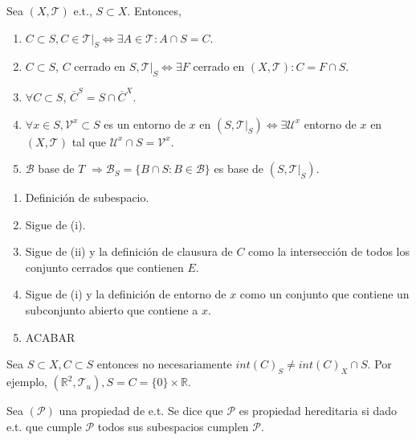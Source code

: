 \begin{prop}
  Sea $( X, \mathcal{T} )$ e.t., $S \subset X$. Entonces,
  \begin{enumerate}[label=(\roman*)]
    \item $C \subset S, C \in \mathcal{T}|_{S} \Leftrightarrow \exists A \in \mathcal{T} : A \cap S = C$.
    \item $C \subset S$, $C$ cerrado en $S, \mathcal{T}|_{S} \Leftrightarrow \exists F$ cerrado en $( X, \mathcal{T} ): C = F \cap S$.
    \item $\forall C \subset S$, $\overline{C}^{S} = S \cap \overline{C}^{X}$.
    \item $\forall x \in S, \mathcal{V}^{x} \subset S$ es un entorno de $x$ en $( S, \mathcal{T}|_{S} ) \Leftrightarrow \exists \mathcal{U}^{x}$ entorno de $x$ en $( X, \mathcal{T} )$ tal que $\mathcal{U}^{x} \cap S = \mathcal{V}^{x}$.
    \item $\mathcal{B}$ base de $T$ $\Rightarrow \mathcal{B}_{S} = \{  B \cap S : B \in \mathcal{B} \}$ es base de $( S, \mathcal{T}|_{S} )$.
  \end{enumerate}
\end{prop}

\begin{dem}
  \begin{enumerate}[label=(\roman*)]
    \item Definición de subespacio.
    \item Sigue de (i).
    \item Sigue de (ii) y la definición de clausura de $C$ como la intersección de todos los conjunto cerrados que contienen $E$.
    \item Sigue de (i) y la definición de entorno de $x$ como un conjunto que contiene un subconjunto abierto que contiene a $x$.
    \item ACABAR
  \end{enumerate}
\end{dem}

\begin{obs}
  Sea $S \subset X, C \subset S$ entonces no necesariamente $int(C)_{S} \neq int(C)_{X} \cap S$. Por ejemplo, $ ( \mathbb{R}^{2}, \mathcal{T}_{u}), S = C = \{ 0 \} \times \mathbb{R}$.
\end{obs}

\begin{defn}
  Sea $(\mathcal{P})$ una propiedad de e.t. Se dice que $\mathcal{P}$ es propiedad hereditaria si dado e.t. que cumple $\mathcal{P}$ todos sus subespacios cumplen $\mathcal{P}$.
\end{defn}
